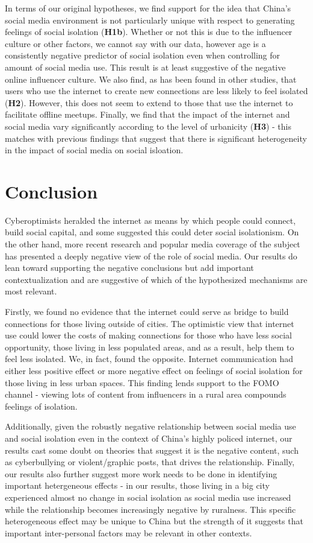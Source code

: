 \documentclass[
  letterpaper,
  DIV=11,
  numbers=noendperiod]{scrartcl}
\begin{document}
In terms of our original hypotheses, we find support for the idea that
China's social media environment is not particularly unique with respect
to generating feelings of social isolation (\textbf{H1b}). Whether or
not this is due to the influencer culture or other factors, we cannot
say with our data, however age is a consistently negative predictor of
social isolation even when controlling for amount of social media use.
This result is at least suggestive of the negative online influencer
culture. We also find, as has been found in other studies, that users
who use the internet to create new connections are less likely to feel
isolated (\textbf{H2}). However, this does not seem to extend to those
that use the internet to facilitate offline meetups. Finally, we find
that the impact of the internet and social media vary significantly
according to the level of urbanicity (\textbf{H3}) - this matches with
previous findings that suggest that there is significant heterogeneity
in the impact of social media on social isloation.

\section{Conclusion}\label{conclusion}

Cyberoptimists heralded the internet as means by which people could
connect, build social capital, and some suggested this could deter
social isolationism. On the other hand, more recent research and popular
media coverage of the subject has presented a deeply negative view of
the role of social media. Our results do lean toward supporting the
negative conclusions but add important contextualization and are
suggestive of which of the hypothesized mechanisms are most relevant.

Firstly, we found no evidence that the internet could serve as bridge to
build connections for those living outside of cities. The optimistic
view that internet use could lower the costs of making connections for
those who have less social opportunity, those living in less populated
areas, and as a result, help them to feel less isolated. We, in fact,
found the opposite. Internet communication had either less positive
effect or more negative effect on feelings of social isolation for those
living in less urban spaces. This finding lends support to the FOMO
channel - viewing lots of content from influencers in a rural area
compounds feelings of isolation.

Additionally, given the robustly negative relationship between social
media use and social isolation even in the context of China's highly
policed internet, our results cast some doubt on theories that suggest
it is the negative content, such as cyberbullying or violent/graphic
posts, that drives the relationship. Finally, our results also further
suggest more work needs to be done in identifying important hetergeneous
effects - in our results, those living in a big city experienced almost
no change in social isolation as social media use increased while the
relationship becomes increasingly negative by ruralness. This specific
heterogeneous effect may be unique to China but the strength of it
suggests that important inter-personal factors may be relevant in other
contexts.
\end{document}
